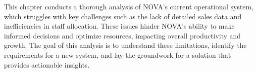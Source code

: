 This chapter conducts a thorough analysis of NOVA's current operational system, which struggles with key challenges
such as the lack of detailed sales data and inefficiencies in staff allocation.
These issues hinder NOVA's ability to make informed decisions and optimize resources, impacting overall productivity
and growth.
The goal of this analysis is to understand these limitations, identify the requirements for a new system,
and lay the groundwork for a solution that provides actionable insights.
